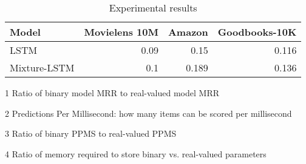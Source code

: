 \documentclass[sigchi]{acmart}
\begin{document}
\begin{table*}[htbp]
\begin{threeparttable}
\caption{Experimental results}
\label{tb:results}
\begin{tabular}{lrrr}
\toprule
 Model        &   Movielens 10M &   Amazon &   Goodbooks-10K \\
\midrule
 LSTM         &            0.09 &    0.15  &           0.116 \\
 Mixture-LSTM &            0.1  &    0.189 &           0.136 \\
\bottomrule
\end{tabular}
\begin{tablenotes}
\small{
\item[1] Ratio of binary model MRR to real-valued model MRR
\item[2] Predictions Per Millisecond: how many items can be scored per millisecond
\item[3] Ratio of binary PPMS to real-valued PPMS
\item[4] Ratio of memory required to store binary vs. real-valued parameters
}
\end{tablenotes}
\end{threeparttable}
\end{table*}



\end{document}
